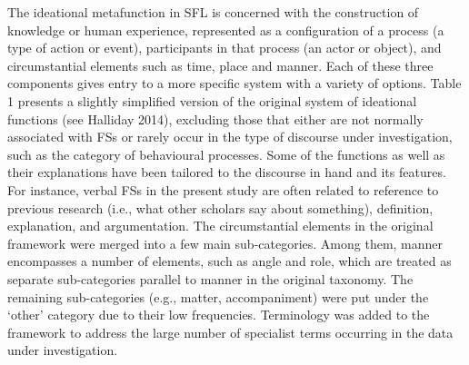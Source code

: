 \documentclass[12pt]{article}
\newenvironment{styleStandard}{\setlength\leftskip{0cm}\setlength\rightskip{0cm plus 1fil}\setlength\parindent{0cm}\setlength\parfillskip{0pt plus 1fil}\setlength\parskip{0cm plus 1pt}\writerlistparindent\writerlistleftskip\leavevmode\normalfont\normalsize\writerlistlabel\ignorespaces}{\unskip\vspace{0cm plus 1pt}\par}
\newcommand\writerlistleftskip{}
\newcommand\writerlistparindent{}
\newcommand\writerlistlabel{}
\begin{document}
\begin{styleStandard}
The ideational metafunction in SFL is concerned with the construction of knowledge or human experience, represented as a configuration of a process (a type of action or event), participants in that process (an actor or object), and circumstantial elements such as time, place and manner. Each of these three components gives entry to a more specific system with a variety of options. Table 1 presents a slightly simplified version of the original system of ideational functions (see Halliday 2014), excluding those that either are not normally associated with FSs or rarely occur in the type of discourse under investigation, such as the category of behavioural processes. Some of the functions as well as their explanations have been tailored to the discourse in hand and its features. For instance, verbal FSs in the present study are often related to reference to previous research (i.e., what other scholars say about something), definition, explanation, and argumentation. The circumstantial elements in the original framework were merged into a few main sub-categories. Among them, manner encompasses a number of elements, such as angle and role, which are treated as separate sub-categories parallel to manner in the original taxonomy. The remaining sub-categories (e.g., matter, accompaniment) were put under the ‘other’ category due to their low frequencies. Terminology was added to the framework to address the large number of specialist terms occurring in the data under investigation.
\end{styleStandard}
\end{document}
